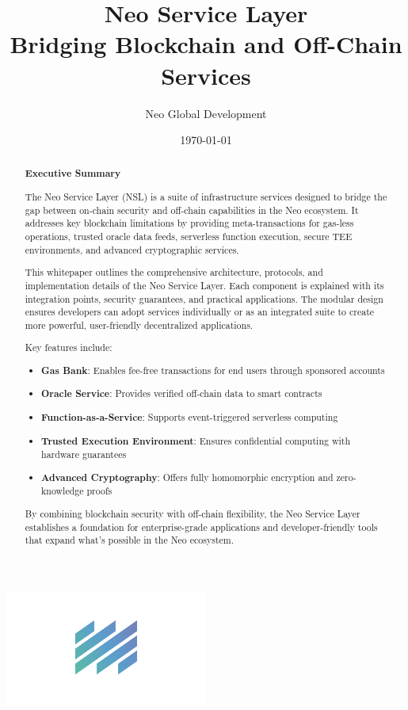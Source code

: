 \documentclass[11pt]{article}
\title{\Huge Neo Service Layer\\
\vspace{0.5cm}
\Large Bridging Blockchain and Off-Chain Services}
\author{Neo Global Development}
\date{\today}
\begin{document}
\maketitle

\begin{center}
\includegraphics[width=0.5\textwidth]{figures/logo.png}
\end{center}

\pagebreak

\begin{abstract}
\noindent
\textbf{Executive Summary}

The Neo Service Layer (NSL) is a suite of infrastructure services designed to bridge the gap between on-chain security and off-chain capabilities in the Neo ecosystem. It addresses key blockchain limitations by providing meta-transactions for gas-less operations, trusted oracle data feeds, serverless function execution, secure TEE environments, and advanced cryptographic services.

This whitepaper outlines the comprehensive architecture, protocols, and implementation details of the Neo Service Layer. Each component is explained with its integration points, security guarantees, and practical applications. The modular design ensures developers can adopt services individually or as an integrated suite to create more powerful, user-friendly decentralized applications.

Key features include:
\begin{itemize}
    \item \textbf{Gas Bank}: Enables fee-free transactions for end users through sponsored accounts
    \item \textbf{Oracle Service}: Provides verified off-chain data to smart contracts
    \item \textbf{Function-as-a-Service}: Supports event-triggered serverless computing 
    \item \textbf{Trusted Execution Environment}: Ensures confidential computing with hardware guarantees
    \item \textbf{Advanced Cryptography}: Offers fully homomorphic encryption and zero-knowledge proofs
\end{itemize}

By combining blockchain security with off-chain flexibility, the Neo Service Layer establishes a foundation for enterprise-grade applications and developer-friendly tools that expand what's possible in the Neo ecosystem.
\end{abstract}
\end{document}
